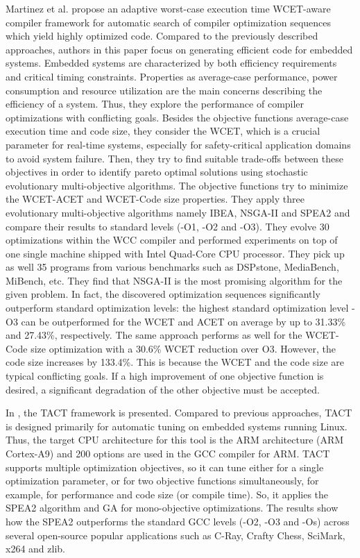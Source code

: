 Martinez et al.\cite{martinez2014multi} propose an adaptive worst-case execution time WCET-aware compiler framework for automatic search of compiler optimization sequences which yield highly optimized code. 
Compared to the previously described approaches, authors in this paper focus on generating efficient code for embedded systems. Embedded systems are characterized by both efficiency requirements and critical timing constraints. Properties as average-case performance, power consumption and resource utilization are the main concerns describing the efficiency of a system. 
Thus, they explore the performance of compiler optimizations with conflicting goals. 
Besides the objective functions average-case execution time and code size, they consider the WCET, which is a crucial parameter for real-time systems, especially for safety-critical application domains to avoid system failure. 
Then, they try to find suitable trade-offs between these objectives in order to identify pareto optimal solutions using stochastic evolutionary multi-objective algorithms. The objective functions try to minimize the WCET-ACET and WCET-Code size properties. They apply three evolutionary multi-objective algorithms namely IBEA, NSGA-II and SPEA2 and compare their results to standard levels (-O1, -O2 and -O3). 
They evolve 30 optimizations within the WCC compiler and performed experiments on top of one single machine shipped with Intel Quad-Core CPU processor. They pick up as well 35  programs from various benchmarks such as DSPstone, MediaBench, MiBench, etc.
They find that NSGA-II is the most promising algorithm for the given problem. In fact, the discovered optimization sequences significantly outperform standard optimization levels:
the highest standard optimization level -O3 can be outperformed for the WCET and ACET on average by up to 31.33\% and 27.43\%, respectively. The same approach performs as well for the WCET-Code size optimization with a 30.6\% WCET reduction over O3. However, the code size increases by 133.4\%. This is because the WCET and the code size are typical conflicting goals. If a high improvement of one objective function is desired, a significant degradation of the other objective must be accepted.

In \cite{plotnikov2013automatic}, the TACT framework is presented. 
Compared to previous approaches, TACT is designed primarily for automatic tuning on embedded systems running Linux. Thus, the target CPU architecture for this tool is the ARM architecture (ARM Cortex-A9) and 200 options are used in the GCC compiler for ARM. 
TACT supports multiple optimization objectives, so it can tune either for a single optimization parameter, or for two objective functions simultaneously, for example, for performance and code size (or compile time). So, it applies the SPEA2 algorithm and GA for mono-objective optimizations.
The results show how the SPEA2 outperforms the standard GCC levels (-O2, -O3 and -Os) across several open-source popular applications such as  C-Ray, Crafty Chess, SciMark, x264 and zlib.


